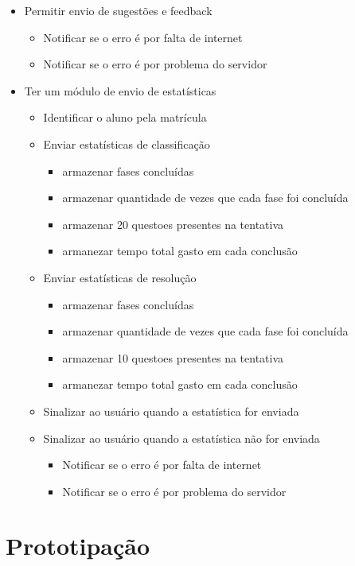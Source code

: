 \begin{itemize}
	\item Permitir envio de sugestões e feedback
		\begin{itemize}
			\item Notificar se o erro é por falta de internet
			\item Notificar se o erro é por problema do servidor			
		\end{itemize}

	\item Ter um módulo de envio de estatísticas
		\begin{itemize}
			\item Identificar o aluno pela matrícula
			\item Enviar estatísticas de classificação
				\begin{itemize}
					\item armazenar fases concluídas
					\item armazenar quantidade de vezes que cada fase foi concluída
					\item armazenar 20 questoes presentes na tentativa
					\item armanezar tempo total gasto em cada conclusão
				\end{itemize}
			\item Enviar estatísticas de resolução
				\begin{itemize}
					\item armazenar fases concluídas
					\item armazenar quantidade de vezes que cada fase foi concluída
					\item armazenar 10 questoes presentes na tentativa
					\item armanezar tempo total gasto em cada conclusão
				\end{itemize}
			\item Sinalizar ao usuário quando a estatística for enviada
			\item Sinalizar ao usuário quando a estatística não for enviada
				\begin{itemize}
					\item Notificar se o erro é por falta de internet
					\item Notificar se o erro é por problema do servidor
				\end{itemize}
		\end{itemize}
\end{itemize}

\section[Prototipação]{Prototipação}

